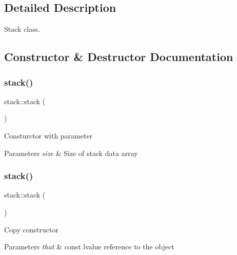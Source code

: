 \subsection{Detailed Description}
Stack class. 

\subsection{Constructor \& Destructor Documentation}
\mbox{\label{classstack_ad1417df58803f247fa6437631a1beeef}} 
\subsubsection{\texorpdfstring{stack()}{stack()}\hspace{0.1cm}{\footnotesize\ttfamily [1/3]}}
{\footnotesize\ttfamily stack\+::stack (\begin{DoxyParamCaption}\item[{size\+\_\+t}]{ }\end{DoxyParamCaption})}

Consturctor with parameter


\begin{DoxyParams}{Parameters}
{\em size} & Size of stack data array \\
\hline
\end{DoxyParams}
\mbox{\label{classstack_a6664e76c4bdc9b907e41e458d4324603}} 
\subsubsection{\texorpdfstring{stack()}{stack()}\hspace{0.1cm}{\footnotesize\ttfamily [2/3]}}
{\footnotesize\ttfamily stack\+::stack (\begin{DoxyParamCaption}\item[{const \hyperlink{classstack}{stack} \&}]{ }\end{DoxyParamCaption})}

Copy constructor


\begin{DoxyParams}{Parameters}
{\em that} & const lvalue reference to the object \\
\hline
\end{DoxyParams}
\mbox{\label{classstack_a62a3ddd238e62abed272e4557509fd23}} 
